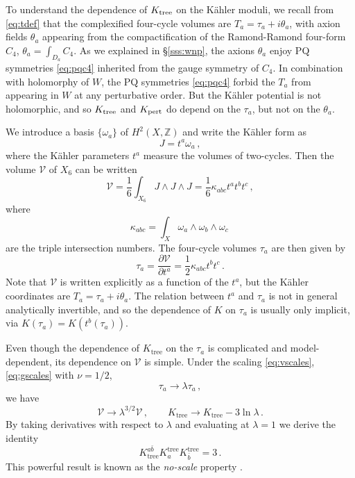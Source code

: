 \documentclass[12pt,a4wide]{article}
\def\V{\mathcal{V}}
\begin{document}
To understand the dependence of $K_{\rm {tree}}$ on the K\"ahler moduli,
we recall from \eqref{eq:tdef} that the complexified four-cycle volumes are $T_a=\tau_a + i\theta_a$, with axion fields $\theta_a$  appearing from the compactification of the Ramond-Ramond four-form $C_4$,  $\theta_a=\int_{D_a}C_4$.
As we explained in \S\ref{sss:wnp}, the axions $\theta_a$ 
enjoy PQ symmetries \eqref{eq:pqc4} inherited from the gauge symmetry of $C_4$.  In combination with holomorphy of $W$, the PQ symmetries \eqref{eq:pqc4} forbid the $T_a$ from appearing in $W$ at any perturbative order.
But the K\"ahler potential 
is not holomorphic,
and so $K_{\rm {tree}}$ and $K_{\rm {pert}}$ do depend on the $\tau_a$, but not on the $\theta_a$.
 
We introduce a basis $\{\omega_a\}$ of $H^2(X,\mathbb{Z})$ and
write the K\"ahler form as 
\begin{equation}
    J=t^a \omega_a\,,
\end{equation}
where the K\"ahler parameters $t^a$ measure the volumes of two-cycles.
Then the volume $\V$ of $X_6$ can be written
\begin{equation}\label{eq:calvolis}
    \V=\frac{1}{6}\int_{X_6} J\wedge J \wedge J=\frac{1}{6}\kappa_{abc}t^a t^b t^c\,,
\end{equation}
where 
\begin{equation}
   \kappa_{abc}=\int_X \omega_a\wedge\omega_b\wedge \omega_c\,
\end{equation}
are the triple intersection numbers.
The four-cycle volumes $\tau_a$ are then given by
\begin{equation}\label{eq:tauis}
    \tau_a=\frac{\partial \V}{\partial t^a}=\frac{1}{2}\kappa_{abc}t^b t^c\,.
\end{equation}
Note that $\V$ is written explicitly as a function of the $t^a$, but the K\"ahler coordinates are $T_a = \tau_a + i \theta_a$. The relation between $t^a$ and $\tau_a$ is not in general analytically invertible, and so the dependence of $K$ on $\tau_a$ is usually only implicit, via $K(\tau_a)=K(t^b(\tau_a))$.

Even though the dependence of $K_{\text{tree}}$   on the  $\tau_a$ is complicated and model-dependent, its dependence on 
$\V$ is simple.  Under the scaling \eqref{eq:vscales}, \eqref{eq:gscales} with $\nu=1/2$,
\begin{equation}
    \tau_a\rightarrow \lambda \tau_a\,,
\end{equation} we have
\begin{equation}
    \V\rightarrow \lambda^{3/2}\V\,, \qquad  K_{\text{tree}}\rightarrow K_{\text{tree}}-3\ln\lambda\,.
\end{equation}
By taking derivatives with respect to $\lambda$ and evaluating at $\lambda=1$ we  derive the identity
\begin{equation}\label{eq:noscaleprop}
    K^{a\bar b}_{\text{tree}}K_a^{\text{tree}} K_{\bar b}^{\text{tree}}=3\,.
\end{equation}
This powerful result is known as the {\emph{no-scale} property} \cite{Cremmer:1983bf}. 
 
\end{document}
